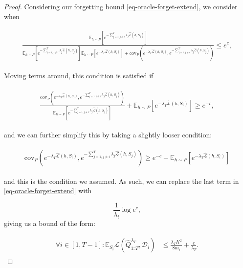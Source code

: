 \documentclass{article}
\theoremstyle{plain}
\theoremstyle{definition}
\theoremstyle{remark}
\begin{document}
\begin{proof}
Considering our forgetting bound \eqref{eq-oracle-forget-extend}, we consider when 

\begin{align*} 
\begin{split}
\frac{\mathbb{E}_{h\sim P}\left [e^{-\sum_{j=1,j\neq i}^{T}\lambda_j\hat{\mathcal{L}}(h,S_j)} \right ]}{\mathbb{E}_{h\sim P}\left [e^{-\sum_{j=1,j\neq i}^{T}\lambda_j\hat{\mathcal{L}}(h,S_j)} \right ]\mathbb{E}_{h\sim P}\left [e^{-\lambda_T\hat{\mathcal{L}}(h,S_i)} \right ]+\mathrm{cov}_{P}(e^{-\lambda_T\hat{\mathcal{L}}(h,S_i)}, e^{-\sum_{j=1,j\neq i}^{T}\lambda_j\hat{\mathcal{L}}(h,S_j)})} \leq e^{c},
\end{split}
\end{align*}

Moving terms around, this condition is satisfied if

\begin{align*} 
\begin{split}
\frac{\mathrm{cov}_{P}(e^{-\lambda_T\hat{\mathcal{L}}(h,S_i)}, e^{-\sum_{j=1,j\neq i}^{T}\lambda_j\hat{\mathcal{L}}(h,S_j)})}{\mathbb{E}_{h\sim P}\left [e^{-\sum_{j=1,j\neq i}^{T}\lambda_j\hat{\mathcal{L}}(h,S_j)} \right ]}+\mathbb{E}_{h\sim P}\left [e^{-\lambda_T\hat{\mathcal{L}}(h,S_i)} \right ]
 \geq e^{-c},
\end{split}
\end{align*}

and we can further simplify this by taking a slightly looser condition:

\begin{align*} 
\begin{split}
\mathrm{cov}_{P}(e^{-\lambda_T\hat{\mathcal{L}}(h,S_i)}, e^{-\sum_{j=1,j\neq i}^{T}\lambda_j\hat{\mathcal{L}}(h,S_j)})
 \geq e^{-c}-\mathbb{E}_{h\sim P}\left [e^{-\lambda_T\hat{\mathcal{L}}(h,S_i)} \right ]
\end{split}
\end{align*}

and this is the condition we assumed. As such, we can replace the last term in \eqref{eq-oracle-forget-extend} with 

$$\frac{1}{\lambda_t}\log e^{c},$$
giving us a bound of the form:

\begin{align} \label{eq-oracle-forget-extend-best}
\begin{split}
\forall i\in[1,T-1]:
\mathbb{E}_{S_i}\mathcal{L}(\hat{Q}^{\lambda_T}_{1:T}, \mathcal{D}_i) &\leq \frac{\lambda_T K^2}{8m_i}+\frac{c}{\lambda_T}.
\end{split}
\end{align}

\end{proof}
\end{document}

